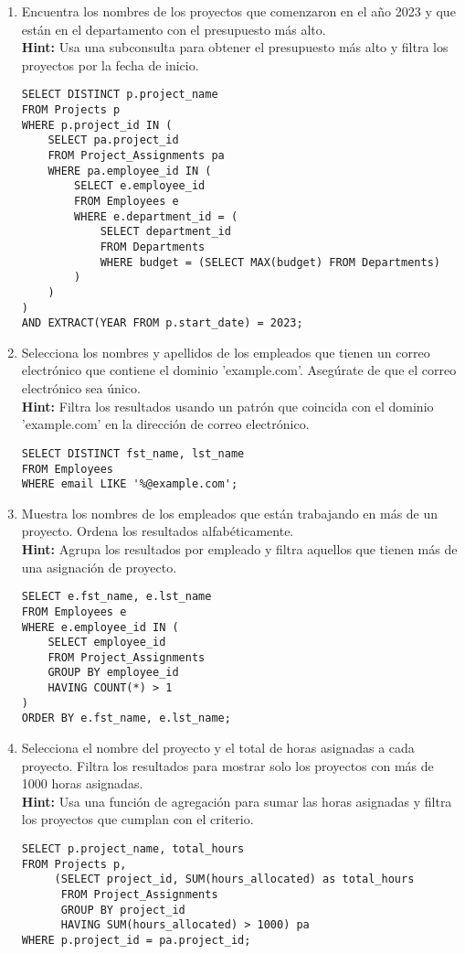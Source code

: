 \begin{enumerate}
    \item Encuentra los nombres de los proyectos que comenzaron en el año 2023 y que están en el departamento con el presupuesto más alto.
    \\
    \textbf{Hint:} Usa una subconsulta para obtener el presupuesto más alto y filtra los proyectos por la fecha de inicio.
    \begin{verbatim}
SELECT DISTINCT p.project_name
FROM Projects p
WHERE p.project_id IN (
    SELECT pa.project_id
    FROM Project_Assignments pa
    WHERE pa.employee_id IN (
        SELECT e.employee_id
        FROM Employees e
        WHERE e.department_id = (
            SELECT department_id
            FROM Departments
            WHERE budget = (SELECT MAX(budget) FROM Departments)
        )
    )
)
AND EXTRACT(YEAR FROM p.start_date) = 2023;
    \end{verbatim}

    \item Selecciona los nombres y apellidos de los empleados que tienen un correo electrónico que contiene el dominio 'example.com'. Asegúrate de que el correo electrónico sea único.
    \\
    \textbf{Hint:} Filtra los resultados usando un patrón que coincida con el dominio 'example.com' en la dirección de correo electrónico.
    \begin{verbatim}
SELECT DISTINCT fst_name, lst_name
FROM Employees
WHERE email LIKE '%@example.com';
    \end{verbatim}

    \item Muestra los nombres de los empleados que están trabajando en más de un proyecto. Ordena los resultados alfabéticamente.
    \\
    \textbf{Hint:} Agrupa los resultados por empleado y filtra aquellos que tienen más de una asignación de proyecto.
    \begin{verbatim}
SELECT e.fst_name, e.lst_name
FROM Employees e
WHERE e.employee_id IN (
    SELECT employee_id
    FROM Project_Assignments
    GROUP BY employee_id
    HAVING COUNT(*) > 1
)
ORDER BY e.fst_name, e.lst_name;
    \end{verbatim}

    \item Selecciona el nombre del proyecto y el total de horas asignadas a cada proyecto. Filtra los resultados para mostrar solo los proyectos con más de 1000 horas asignadas.
    \\
    \textbf{Hint:} Usa una función de agregación para sumar las horas asignadas y filtra los proyectos que cumplan con el criterio.
    \begin{verbatim}
SELECT p.project_name, total_hours
FROM Projects p,
     (SELECT project_id, SUM(hours_allocated) as total_hours
      FROM Project_Assignments
      GROUP BY project_id
      HAVING SUM(hours_allocated) > 1000) pa
WHERE p.project_id = pa.project_id;
    \end{verbatim}

\end{enumerate}

